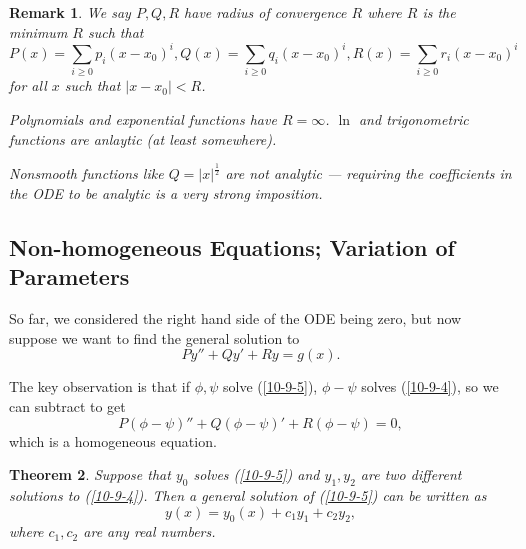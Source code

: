 \documentclass{tufte-handout}
\newtheorem{thm}{Theorem}[subsection]
\newtheorem{rmk}[thm]{Remark}
\theoremstyle{definition}
\begin{document}
\begin{rmk}
	We say $P,Q,R$ have radius of convergence $R$ where $R$ is the minimum $R$ such that \[
		P(x) = \sum\limits_{i\ge 0}^{} p_i (x-x_0)^{i}, Q(x) = \sum\limits_{i\ge 0} q_i (x-x_0)^{i}, R(x) = \sum\limits_{i \ge 0}^{} r_i (x-x_0)^{i}
	\] for all $x$ such that $\left| x - x_0 \right| < R$. 

	Polynomials and exponential functions have $R = \infty$. $\ln$ and trigonometric functions are anlaytic (at least somewhere).

	Nonsmooth functions like $Q = \left| x \right|^{\frac{1}{2}}$ are not analytic --- requiring the coefficients in the ODE to be analytic is a very strong imposition.
\end{rmk}

\subsection{Non-homogeneous Equations; Variation of Parameters}
 So far, we considered the right hand side of the ODE being zero, but now suppose we want to find the general solution to
 \begin{equation}
	 Py'' + Q y' + Ry = g(x)	.			\label{10-9-5}
 \end{equation}

 The key observation is that if $\phi, \psi$ solve (\ref{10-9-5}), $\phi - \psi$ solves (\ref{10-9-4}), so we can subtract to get \[
 	P(\phi - \psi)'' + Q(\phi - \psi)' + R(\phi - \psi) = 0
 ,\] which is a homogeneous equation.

 \begin{thm}
	 Suppose that $y_0$ solves (\ref{10-9-5}) and $y_1,y_2$ are two different solutions to (\ref{10-9-4}). Then a general solution of (\ref{10-9-5}) can be written as \[
	 	y(x) = y_0(x) + c_1y_1 + c_2y_2
	 ,\] where $c_1,c_2$ are any real numbers. 
 \end{thm}
 
\end{document}
